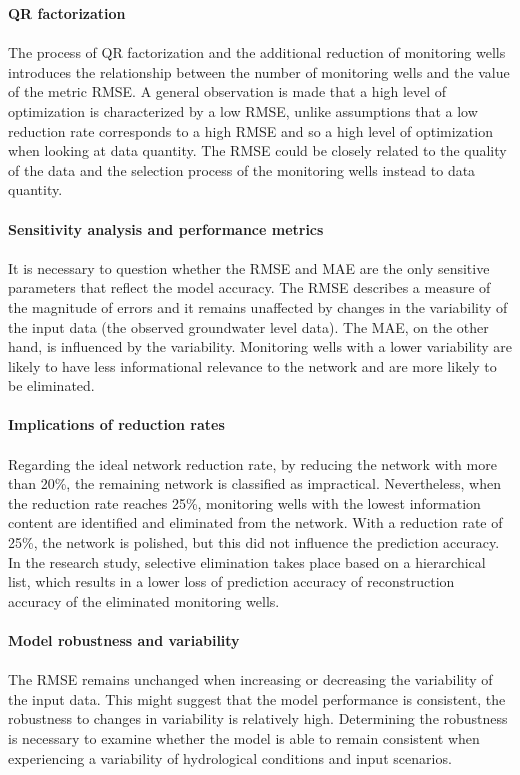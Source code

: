 \textbf{QR factorization}\\
\\
The process of QR factorization and the additional reduction of monitoring wells introduces the relationship between the number of monitoring wells and the value of the metric RMSE. A general observation is made that a high level of optimization is characterized by a low RMSE, unlike assumptions that a low reduction rate corresponds to a high RMSE and so a high level of optimization when looking at data quantity. The RMSE could be closely related to the quality of the data and the selection process of the monitoring wells instead to data quantity. \\
\\
\textbf{Sensitivity analysis and performance metrics}\\
\\
It is necessary to question whether the RMSE and MAE are the only sensitive parameters that reflect the model accuracy. The RMSE describes a measure of the magnitude of errors and it remains unaffected by changes in the variability of the input data (the observed groundwater level data). The MAE, on the other hand, is influenced by the variability. Monitoring wells with a lower variability are likely to have less informational relevance to the network and are more likely to be eliminated. \\
\\
\textbf{Implications of reduction rates}\\
\\
Regarding the ideal network reduction rate, by reducing the network with more than 20\%, the remaining network is classified as impractical. Nevertheless, when the reduction rate reaches 25\%, monitoring wells with the lowest information content are identified and eliminated from the network. With a reduction rate of 25\%, the network is polished, but this did not influence the prediction accuracy. In the research study, selective elimination takes place based on a hierarchical list, which results in a lower loss of prediction accuracy of reconstruction accuracy of the eliminated monitoring wells. \\
\\
\textbf{Model robustness and variability}\\
\\
The RMSE remains unchanged when increasing or decreasing the variability of the input data. This might suggest that the model performance is consistent, the robustness to changes in variability is relatively high. Determining the robustness is necessary to examine whether the model is able to remain consistent when experiencing a variability of hydrological conditions and input scenarios. \\
